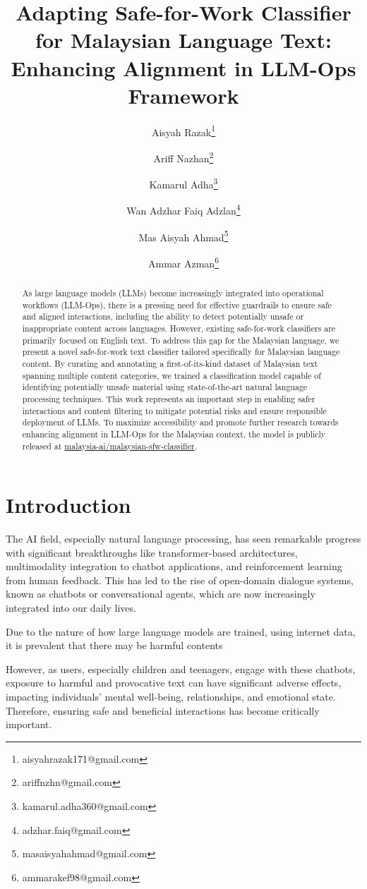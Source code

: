 \documentclass[preprint]{article}
\title{Adapting Safe-for-Work Classifier for Malaysian Language Text: Enhancing Alignment in LLM-Ops Framework}
\author{
  Aisyah Razak\thanks{aisyahrazak171@gmail.com} \and
  Ariff Nazhan\thanks{ariffnzhn@gmail.com} \and
  Kamarul Adha\thanks{kamarul.adha360@gmail.com} \and
  Wan Adzhar Faiq Adzlan\thanks{adzhar.faiq@gmail.com} \and
  Mas Aisyah Ahmad\thanks{masaisyahahmad@gmail.com} \and
  Ammar Azman\thanks{ammarakef98@gmail.com} \and
}
\begin{document}
\maketitle

\begin{abstract}

As large language models (LLMs) become increasingly integrated into operational workflows (LLM-Ops), there is a pressing need for effective guardrails to ensure safe and aligned interactions, including the ability to detect potentially unsafe or inappropriate content across languages. However, existing safe-for-work classifiers are primarily focused on English text. To address this gap for the Malaysian language, we present a novel safe-for-work text classifier tailored specifically for Malaysian language content. By curating and annotating a first-of-its-kind dataset of Malaysian text spanning multiple content categories, we trained a classification model capable of identifying potentially unsafe material using state-of-the-art natural language processing techniques. This work represents an important step in enabling safer interactions and content filtering to mitigate potential risks and ensure responsible deployment of LLMs. To maximize accessibility and promote further research towards enhancing alignment in LLM-Ops for the Malaysian context, the model is publicly released at \href{https://huggingface.co/malaysia-ai/malaysian-sfw-classifier}{malaysia-ai/malaysian-sfw-classifier}.
\end{abstract}


\section{Introduction}

The AI field, especially natural language processing, \cite{markov2023holistic} has seen remarkable progress with significant breakthroughs like transformer-based architectures, multimodality integration to chatbot applications, and reinforcement learning from human feedback. This has led to the rise of open-domain dialogue systems, known as chatbots or conversational agents, which are now increasingly integrated into our daily lives.

Due to the nature of how large language models are trained, using internet data, it is prevalent that there may be harmful contents 

However, as users, especially children and teenagers, engage with these chatbots, exposure to harmful and provocative text can have significant adverse effects, impacting individuals' mental well-being, relationships, and emotional state. Therefore, ensuring safe and beneficial interactions has become critically important.
\end{document}
